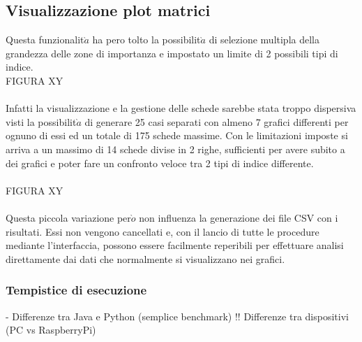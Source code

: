 \subsection{Visualizzazione plot matrici}
Questa funzionalit$\grave{a}$ ha pero tolto la possibilit$\grave{a}$ di selezione multipla della grandezza delle zone di importanza
e impostato un limite di 2 possibili tipi di indice.
\\
FIGURA XY\\
\\
Infatti la visualizzazione e la gestione delle schede sarebbe stata troppo dispersiva visti la possibilit$\grave{a}$ di
generare 25 casi separati con almeno 7 grafici differenti per ognuno di essi ed un totale di 175 schede massime.
Con le limitazioni imposte si arriva a un massimo di 14 schede divise in 2 righe, sufficienti per avere subito
a dei grafici e poter fare un confronto veloce tra 2 tipi di indice differente.\\
\\
FIGURA XY\\
\\
Questa piccola variazione per$\grave{o}$ non influenza la generazione dei file CSV con i risultati. Essi non vengono cancellati
e, con il lancio di tutte le procedure mediante l'interfaccia, possono essere facilmente reperibili per effettuare
analisi direttamente dai dati che normalmente si visualizzano nei grafici.

\subsubsection{Tempistice di esecuzione}
- Differenze tra Java e Python (semplice benchmark)
!! Differenze tra dispositivi (PC vs RaspberryPi)
